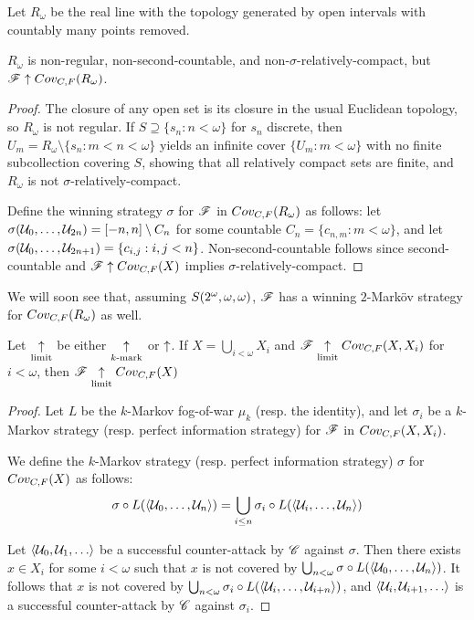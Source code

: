 \begin{defn}
  Let $R_\omega$ be the real line with the topology generated by open
  intervals with countably many points removed.
\end{defn}

\begin{thm}
  $R_\omega$ is non-regular, non-second-countable, and
  non-$\sigma$-relatively-compact, but $\mathscr{F}\uparrow Cov_{C,F}(R_\omega)$.
\end{thm}

\begin{proof}
  The closure of any open set is its closure in the usual Euclidean topology,
  so $R_\omega$ is not regular. If $S\supseteq\{s_n:n<\omega\}$ for $s_n$
  discrete, then $U_m=R_\omega\setminus\{s_n:m<n<\omega\}$ yields an
  infinite cover $\{U_m:m<\omega\}$ with no finite subcollection covering $S$,
  showing that all relatively compact sets are finite, and $R_\omega$ is not
  $\sigma$-relatively-compact.

  Define the winning strategy $\sigma$ for $\mathscr{F}$ in $Cov_{C,F}(R_\omega)$ as
  follows: let $\sigma(\mathcal{U}_0,\dots,\mathcal{U}_{2n})=[-n,n]\setminus C_n$
  for some countable $C_n=\{c_{n,m}: m<\omega\}$,
  and let $\sigma(\mathcal{U}_0,\dots,\mathcal{U}_{2n+1})=\{c_{i,j} : i,j < n\}$.
  Non-second-countable follows since
  second-countable and $\mathscr{F}\uparrow Cov_{C,F}(X)$ implies
  $\sigma$-relatively-compact.
\end{proof}

We will soon see that, assuming $S(2^\omega,\omega,\omega)$, $\mathscr{F}$ has a winning
$2$-Mark\"ov strategy for $Cov_{C,F}(R_\omega)$ as well.

\begin{prop}
  Let $\underset{\text{limit}}{\uparrow}$ be either $\underset{k\text{-mark}}{\uparrow}$ or $\uparrow$.
  If $X=\bigcup_{i<\omega} X_i$ and $\mathscr{F} \underset{\text{limit}}{\uparrow} Cov_{C,F}(X,X_i)$
  for $i<\omega$, then $\mathscr{F} \underset{\text{limit}}{\uparrow} Cov_{C,F}(X)$
\end{prop}

\begin{proof}
  Let $L$ be the $k$-Markov fog-of-war $\mu_k$ (resp. the identity),
  and let $\sigma_i$ be a $k$-Markov strategy (resp. perfect information
  strategy) for $\mathscr{F}$ in $Cov_{C,F}(X,X_i)$.

  We define the $k$-Markov strategy (resp. perfect information strategy)
  $\sigma$ for $Cov_{C,F}(X)$ as follows:
    \[
      \sigma\circ L(\langle\mathcal{U}_0,\dots,\mathcal{U}_n\rangle)
        =
      \bigcup_{i\leq n}
      \sigma_i\circ L(\langle\mathcal{U}_i,\dots,\mathcal{U}_n\rangle)
    \]

  Let $\<\mc U_0,\mc U_1,\dots\>$ be a successful counter-attack by $\mathscr{C}$
  against $\sigma$. Then there exists $x\in X_i$ for
  some $i<\omega$ such that $x$ is not covered by
  $\bigcup_{n<\omega}\sigma\circ L(\langle\mathcal{U}_0,\dots,\mathcal{U}_n\rangle)$.
  It follows that $x$ is not covered by
  $\bigcup_{n<\omega}\sigma_i\circ L(\langle\mathcal{U}_i,\dots,\mathcal{U}_{i+n}\rangle)$,
  and $\<\mc U_i,\mc U_{i+1},\dots\>$ is a successful counter-attack
  by $\mathscr{C}$ against $\sigma_i$.
\end{proof}

